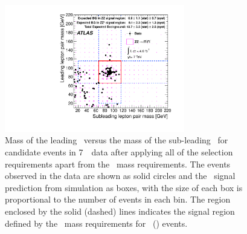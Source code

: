  \begin{figure}[htbp]
 \begin{center}
  \includegraphics[width=0.7\textwidth]{7TeV/h_mz1_mz2.pdf}\hfill
  \caption[Mass of the leading \leppair\ versus the mass of the
  sub-leading \leppair\ for candidate events in 7~\tev\ data, after applying all of the selection
  requirements apart from the \dilepton\ mass requirements .]
  {\small Mass of the leading \leppair\ versus the mass of the
  sub-leading \leppair\ for candidate events in 7~\tev\ data after
  applying all of the selection
  requirements apart from the \dilepton\ mass requirements.
  The events observed in the data are shown as solid circles and the \ZZsllll\
  signal prediction from simulation as boxes,
  with the size of each box is proportional to the number of events in each bin.  
  The region enclosed by the solid (dashed) lines indicates the signal region defined by the
  \dilepton\ mass requirements for \ZZ\ (\ZZs) events.
   }
    \label{fig:zzdists-Zmass2D-seven}
 \end{center}
 \end{figure}

